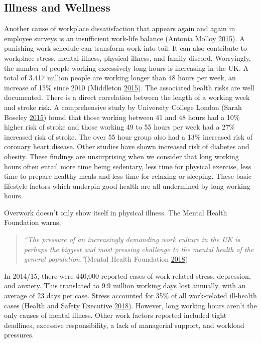 \documentclass[]{tufte-handout}
\begin{document}
\hypertarget{illness-and-wellness}{%
\subsection{Illness and Wellness}\label{illness-and-wellness}}

Another cause of workplace dissatisfaction that appears again and again
in employee surveys is an insufficient work-life balance (Antonia Molloy
\protect\hyperlink{ref-AntoniaMolloy2015}{2015}). A punishing work
schedule can transform work into toil. It can also contribute to
workplace stress, mental illness, physical illness, and family discord.
Worryingly, the number of people working excessively long hours is
increasing in the UK. A total of 3.417 million people are working longer
than 48 hours per week, an increase of 15\% since 2010 (Middleton
\protect\hyperlink{ref-RachelMiddleton2015}{2015}). The associated
health risks are well documented. There is a direct correlation between
the length of a working week and stroke risk. A comprehensive study by
University College London (Sarah Boseley
\protect\hyperlink{ref-SarahBoseley2015}{2015}) found that those working
between 41 and 48 hours had a 10\% higher risk of stroke and those
working 49 to 55 hours per week had a 27\% increased risk of stroke. The
over 55 hour group also had a 13\% increased risk of coronary heart
disease. Other studies have shown increased risk of diabetes and
obesity. These findings are unsurprising when we consider that long
working hours often entail more time being sedentary, less time for
physical exercise, less time to prepare healthy meals and less time for
relaxing or sleeping. These basic lifestyle factors which underpin good
health are all undermined by long working hours.

Overwork doesn't only show itself in physical illness. The Mental Health
Foundation warns,

\begin{quote}
\emph{``The pressure of an increasingly demanding work culture in the UK
is perhaps the biggest and most pressing challenge to the mental health
of the general population.''}(Mental Health Foundation
\protect\hyperlink{ref-MentalHealthFoundation2018}{2018})
\end{quote}

In 2014/15, there were 440,000 reported cases of work-related stress,
depression, and anxiety. This translated to 9.9 million working days
lost annually, with an average of 23 days per case. Stress accounted for
35\% of all work-related ill-health cases (Health and Safety Executive
\protect\hyperlink{ref-HealthandSafetyExecutive2018}{2018}). However,
long working hours aren't the only causes of mental illness. Other work
factors reported included tight deadlines, excessive responsibility, a
lack of managerial support, and workload pressures.
\end{document}
